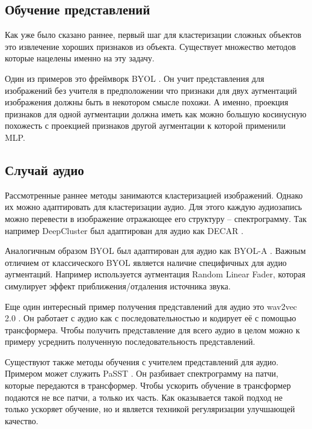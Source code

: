 \documentclass[a4paper,12pt]{extarticle}
\begin{document}
\subsection{Обучение представлений}

Как уже было сказано раннее, первый шаг для кластеризации
сложных объектов это извлечение хороших признаков из объекта.
Существует множество методов которые нацелены именно на эту задачу.

Один из примеров это фреймворк BYOL \cite{NEURIPS2020_f3ada80d}.
Он учит представления для изображений без учителя в предположении 
что признаки для двух аугментаций изображения должны быть 
в некотором смысле похожи. А именно, проекция признаков для 
одной аугментации должна иметь как можно большую косинусную 
похожесть с проекцией признаков другой аугментации к которой 
применили MLP.

\subsection{Случай аудио}

Рассмотренные раннее методы занимаются кластеризацией 
изображений. Однако их можно адаптировать для кластеризации 
аудио. Для этого каждую аудиозапись можно перевести в 
изображение отражающее его структуру -- спектрограмму.
Так например DeepCluster был адаптирован для аудио как 
DECAR \cite{Ghosh2022DECARDC}.

Аналогичным образом BYOL был адаптирован для аудио как 
BYOL-A \cite{BYOL_A}. Важным отличием от классического
BYOL является наличие специфичных для аудио аугментаций.
Например используется аугментация Random Linear Fader, 
которая симулирует эффект приближения/отдаления источника
звука.

Еще один интересный пример получения представлений 
для аудио это wav2vec 2.0 \cite{NEURIPS2020_92d1e1eb}. 
Он работает с аудио как с последовательностью и кодирует 
её с помощью трансформера. Чтобы получить представление 
для всего аудио в целом можно к примеру усреднить полученную
последовательность представлений. 

Существуют также методы обучения с учителем 
представлений для аудио. Примером может служить 
PaSST \cite{Koutini2021EfficientTO}. Он разбивает 
спектрограмму на патчи, которые передаются в трансформер. 
Чтобы ускорить обучение в трансформер подаются не все 
патчи, а только их часть. Как оказывается такой подход не 
только ускоряет обучение, но и является техникой регуляризации
улучшающей качество.
\end{document}
